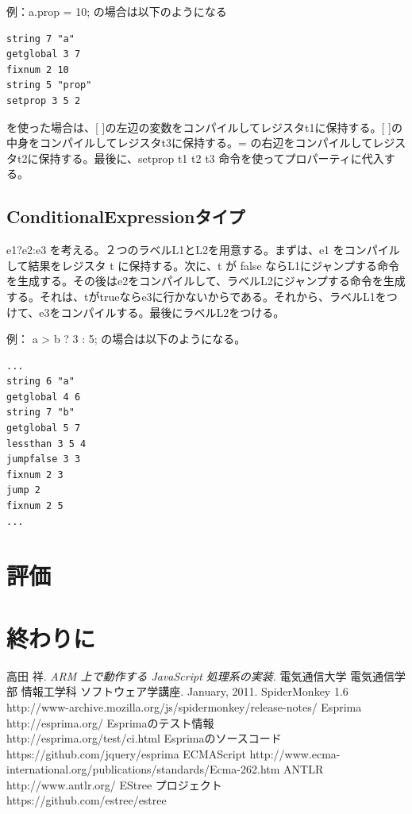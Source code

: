 \documentclass[12pt]{article}
\begin{document}
例：a.prop = 10; の場合は以下のようになる

\begin{lstlisting}
string 7 "a"
getglobal 3 7
fixnum 2 10
string 5 "prop"
setprop 3 5 2
\end{lstlisting}
\FloatBarrier
\hfill \break
[ ] を使った場合は、[ ]の左辺の変数をコンパイルしてレジスタt1に保持する。[ ]の中身をコンパイルしてレジスタt3に保持する。= の右辺をコンパイルしてレジスタt2に保持する。最後に、setprop t1 t2 t3 命令を使ってプロパーティに代入する。

\subsection{ConditionalExpressionタイプ}
e1?e2:e3 を考える。２つのラベルL1とL2を用意する。まずは、e1 をコンパイルして結果をレジスタ t に保持する。次に、t が false ならL1にジャンプする命令を生成する。その後はe2をコンパイルして、ラベルL2にジャンプする命令を生成する。それは、tがtrueならe3に行かないからである。それから、ラベルL1をつけて、e3をコンパイルする。最後にラベルL2をつける。

例： a > b ? 3 : 5; の場合は以下のようになる。\\

\begin{lstlisting}
...
string 6 "a"
getglobal 4 6
string 7 "b"
getglobal 5 7
lessthan 3 5 4
jumpfalse 3 3
fixnum 2 3
jump 2
fixnum 2 5
...
\end{lstlisting}


\section{評価}

\section{終わりに}

\newpage
\begin{thebibliography}{9}
高田 祥. \textit{ARM 上で動作する JavaScript 処理系の実装}. 電気通信大学 電気通信学部
情報工学科 ソフトウェア学講座. January, 2011.
SpiderMonkey 1.6 \newline
http://www-archive.mozilla.org/js/spidermonkey/release-notes/
Esprima \newline
http://esprima.org/
Esprimaのテスト情報 \\
http://esprima.org/test/ci.html
Esprimaのソースコード \\
https://github.com/jquery/esprima
ECMAScript \newline
http://www.ecma-international.org/publications/standards/Ecma-262.htm
ANTLR \newline
http://www.antlr.org/
EStree プロジェクト \\
https://github.com/estree/estree
\end{thebibliography}
\end{document}
